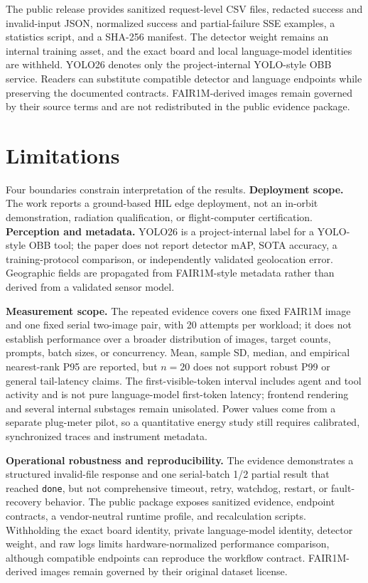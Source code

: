 \documentclass[10pt,letterpaper]{article}
\begin{document}
The public release provides sanitized request-level CSV files, redacted success and invalid-input JSON, normalized success and partial-failure SSE examples, a statistics script, and a SHA-256 manifest. The detector weight remains an internal training asset, and the exact board and local language-model identities are withheld. YOLO26 denotes only the project-internal YOLO-style OBB service. Readers can substitute compatible detector and language endpoints while preserving the documented contracts. FAIR1M-derived images remain governed by their source terms and are not redistributed in the public evidence package.

\section{Limitations}

Four boundaries constrain interpretation of the results. \textbf{Deployment scope.} The work reports a ground-based HIL edge deployment, not an in-orbit demonstration, radiation qualification, or flight-computer certification. \textbf{Perception and metadata.} YOLO26 is a project-internal label for a YOLO-style OBB tool; the paper does not report detector mAP, SOTA accuracy, a training-protocol comparison, or independently validated geolocation error. Geographic fields are propagated from FAIR1M-style metadata rather than derived from a validated sensor model.

\textbf{Measurement scope.} The repeated evidence covers one fixed FAIR1M image and one fixed serial two-image pair, with 20 attempts per workload; it does not establish performance over a broader distribution of images, target counts, prompts, batch sizes, or concurrency. Mean, sample SD, median, and empirical nearest-rank P95 are reported, but $n=20$ does not support robust P99 or general tail-latency claims. The first-visible-token interval includes agent and tool activity and is not pure language-model first-token latency; frontend rendering and several internal substages remain unisolated. Power values come from a separate plug-meter pilot, so a quantitative energy study still requires calibrated, synchronized traces and instrument metadata.

\textbf{Operational robustness and reproducibility.} The evidence demonstrates a structured invalid-file response and one serial-batch 1/2 partial result that reached \texttt{done}, but not comprehensive timeout, retry, watchdog, restart, or fault-recovery behavior. The public package exposes sanitized evidence, endpoint contracts, a vendor-neutral runtime profile, and recalculation scripts. Withholding the exact board identity, private language-model identity, detector weight, and raw logs limits hardware-normalized performance comparison, although compatible endpoints can reproduce the workflow contract. FAIR1M-derived images remain governed by their original dataset license.
\end{document}
